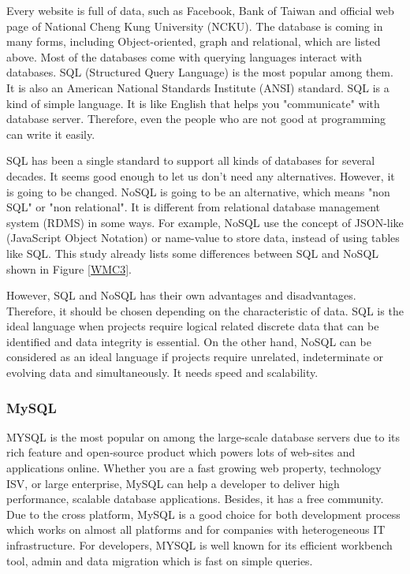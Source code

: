 Every website is full of data, such as Facebook, Bank of Taiwan and official web page of National Cheng Kung University (NCKU).
The database is coming in many forms, including Object-oriented, graph and relational, which are listed above.
Most of the databases come with querying languages interact with databases.
SQL (Structured Query Language) is the most popular among them.
It is also an American National Standards Institute (ANSI) standard.
SQL is a kind of simple language.
It is like English that helps you "communicate" with database server.
Therefore, even the people who are not good at programming can write it easily.


SQL has been a single standard to support all kinds of databases for several decades.
It seems good enough to let us don't need any alternatives.
However, it is going to be changed.
NoSQL is going to be an alternative, which means "non SQL" or "non relational".
It is different from relational database management system (RDMS) in some ways.
For example, NoSQL use the concept of JSON-like (JavaScript Object Notation) or name-value to store data, instead of using tables like SQL.
This study already lists some differences between SQL and NoSQL shown in Figure \ref{WMC3}.


However, SQL and NoSQL has their own advantages and disadvantages.
Therefore, it should be chosen depending on the characteristic of data.
SQL is the ideal language when projects require logical related discrete data that can be identified and data integrity is essential.
On the other hand, NoSQL can be considered as an ideal language if projects require unrelated, indeterminate or evolving data and simultaneously. 
It needs speed and scalability.

\subsubsection{MySQL}
MYSQL is the most popular on among the large-scale database
servers due to its rich feature and open-source product which 
powers lots of web-sites and applications online. Whether you 
are a fast growing web property, technology ISV, or large 
enterprise, MySQL can help a developer to deliver high 
performance, scalable database applications. Besides, it has 
a free community. Due to the cross platform, MySQL is a good 
choice for both development process which works on almost all 
platforms and for companies with heterogeneous IT infrastructure.
For developers, MYSQL is well known for its efficient workbench 
tool, admin and data migration which is fast on simple queries.

